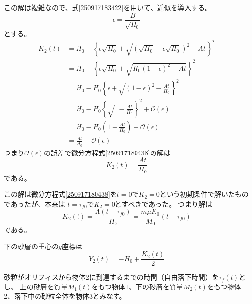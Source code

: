 \documentclass[]{article}
\begin{document}
この解は複雑なので、式\eqref{250917183422}を用いて、近似を導入する。
\begin{equation} \label{250918054610} 
   \epsilon =  \frac{B}{\sqrt{H_0}}
\end{equation}
とする。
\begin{align}
   K_2(t) &= H_0 - \left\{
   				\epsilon \sqrt{H_0} + \sqrt{(\sqrt{H_0}-\epsilon \sqrt{H_0})^2-At}
   				\right\}^2   \label{250918054717a} \\
   &= H_0 - \left\{
   				\epsilon \sqrt{H_0} + \sqrt{H_0(1-\epsilon )^2-At}
   				\right\}^2   \label{250918054717b} \\
   &=   H_0 - H_0\left\{
   				\epsilon  + \sqrt{(1-\epsilon )^2-\frac{At}{H_0}}
   				\right\}^2  \label{250918054717c} \\
   &=    H_0 - H_0\left\{
   				 \sqrt{1-\frac{At}{H_0}}
   				\right\}^2  + \mathcal{O}(\epsilon)  \label{250918054717d}\\
   &=    H_0 - H_0\left(
   				 1-\frac{At}{H_0}
   				\right) + \mathcal{O}(\epsilon)  \label{250918054717e}\\
   &=    \frac{At}{H_0}
   				+ \mathcal{O}(\epsilon)  \label{250918054717f}
\end{align}
つまり$\mathcal{O}(\epsilon) $の誤差で微分方程式\eqref{250917180438}の解は
\begin{equation} \label{250918075020} 
   K_2(t) = \frac{At}{H_0}
\end{equation}
である。



この解は微分方程式\eqref{250917180438}を$t=0$で$K_2=0$という初期条件で解いたものであったが、本来は
$t=\tau_{f0}$で$K_2=0$とすべきであった。
つまり解は
\begin{equation} \label{250917184208} 
   K_2(t) =  \frac{A(t-\tau_{f0})}{H_0} = \frac{m \mu K_0}{M_0}(t-\tau_{f0})
\end{equation}
である。



\color{black}

下の砂層の重心の$y$座標は
\begin{equation} \label{250703154424} 
   Y_2(t) = -H_0 + \frac{K_2(t)}{2} 
\end{equation}



砂粒がオリフィスから物体2に到達するまでの時間（自由落下時間）を$\tau_f(t)$とし、
上の砂層を質量$M_1(t)$をもつ物体1、下の砂層を質量$M_2(t)$をもつ物体2、落下中の砂粒全体を物体3とみなす。
\end{document}
